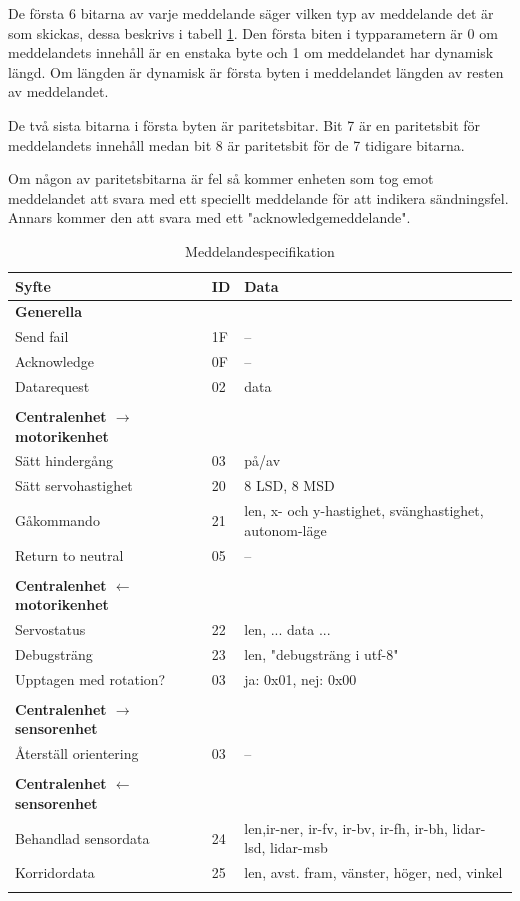 \documentclass[a4paper,titlepage,12pt]{article}
\begin{document}
	De första 6 bitarna av varje meddelande säger vilken typ av meddelande det är som
	skickas, dessa beskrivs i tabell 
	\ref{table:messages}. Den första biten i typparametern är 0 om meddelandets
	innehåll är en enstaka byte och 1 om meddelandet har dynamisk längd. Om längden
	är dynamisk är första byten i meddelandet längden av resten av meddelandet.

	De två sista bitarna i första byten är paritetsbitar. Bit 7 är en  paritetsbit
	för meddelandets innehåll medan bit 8 är paritetsbit för de 7 tidigare bitarna.

	Om någon av paritetsbitarna är fel så kommer enheten som tog emot meddelandet att svara
	med ett speciellt meddelande för att indikera sändningsfel. Annars kommer den 
	att svara med ett "acknowledgemeddelande".

    \newpage
	\begin{longtable}[c]{ l l l }
		\textbf{Syfte} & \textbf{ID} & \textbf{Data} \\ \midrule
		\textbf{Generella} \\ \midrule
		Send fail & 1F & -- \\ \midrule
		Acknowledge & 0F & -- \\ \midrule
		Datarequest & 02 & data \\ \midrule
		\\
		\textbf{Centralenhet $ \to $ motorikenhet}\\ \midrule
		Sätt hindergång & 03 & på/av \\ \midrule
		Sätt servohastighet & 20 & 8 LSD, 8 MSD \\ \midrule
		Gåkommando &  21 & len, x- och y-hastighet, svänghastighet,
        autonom-läge \\ \midrule
		Return to neutral & 05 & -- \\ \midrule
		\\
		\textbf{Centralenhet $ \gets $ motorikenhet}\\ \midrule
		Servostatus & 22 & len, ... data ... \\ \midrule
		Debugsträng & 23 & len, "debugsträng i utf-8" \\ \midrule
		Upptagen med rotation? & 03 & ja: 0x01, nej: 0x00 \\ \midrule
		\\
		\textbf{Centralenhet $\to$ sensorenhet} \\ \midrule
		Återställ orientering & 03 & -- \\ \midrule
		\\
		\textbf{Centralenhet $ \gets $ sensorenhet}\\ \midrule
		Behandlad sensordata & 24 & len,ir-ner, ir-fv, ir-bv, ir-fh, ir-bh,
        lidar-lsd, lidar-msb \\ \midrule
		Korridordata		 & 25 & len, avst. fram, vänster, höger, ned, vinkel \\

		\caption{Meddelandespecifikation \label{table:messages}}
	\end{longtable}
    
\end{document}
